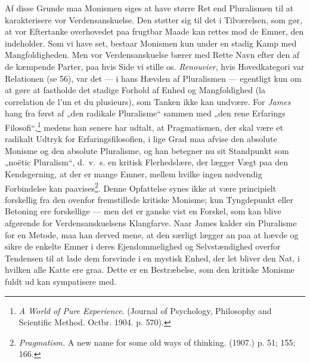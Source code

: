 \documentclass[12pt,a4paper]{book}
\newcommand{\opage}[1]{\marginnote{\footnotesize\textit{[#1]}}}
\begin{document}
Af disse Grunde maa Monismen siges at have større Ret end Pluralismen til at
karakterisere vor Verdensanskuelse. Den støtter sig til det i Tilværelsen, som gør, at
vor Eftertanke overhovedet paa frugtbar Maade kan rettes mod de Emner, den indeholder.
Som vi have set, bestaar Monismen kun under en stadig Kamp med Mangfoldigheden. Men vor
Verdensanskuelse bærer med Rette Navn efter den af de kæmpende Parter, paa hvis Side vi
stille os. \emph{Renouvier}, hvis Hovedkategori var Relationen (se 56), var det --- i
hans Hævden af Pluralismen --- egentligt kun om at gøre at fastholde det stadige Forhold
af Enhed og Mangfoldighed (la correlation de l'un et du plusieurs), som Tanken ikke kan
undvære. For \emph{James} hang fra først af „den radikale Pluralisme“ sammen med „den
rene Erfarings
\opage{326}Filosofi“,\footnote{\emph{A World of Pure Experience}. (Journal of
Psychology, Philosophy and Scientific Method. Octbr. 1904. p. 570).} medens han senere
har udtalt, at Pragmatismen, der skal være et radikalt Udtryk for Erfaringsfilosofien, i
lige Grad maa afvise den absolute Monisme og den absolute Pluralisme, og han betegner nu
sit Standpunkt som „noëtic Pluralism“, d.\ v.\ s. en kritisk Flerhedslære, der lægger
Vægt paa den Kendsgerning, at der er mange Emner, mellem hvilke ingen nødvendig
Forbindelse kan paavises\footnote{\emph{Pragmatism.} A new name for some old ways of thinking. (1907.) p. 51; 155; 166.}. Denne Opfattelse synes ikke at være principielt
forskellig fra den ovenfor fremstillede kritiske Monisme; kun Tyngdepunkt eller Betoning
ere forskellige --- men det er ganske vist en Forskel, som kan blive afgørende for
Verdensanskuelsens Klangfarve. Naar James kalder sin Pluralisme for en Metode, maa han
derved mene, at den særligt lægger an paa at hævde og sikre de enkelte Emner i deres
Ejendommelighed og Selvstændighed overfor Tendensen til at lade dem forsvinde i en
mystisk Enhed, der let bliver den Nat, i hvilken alle Katte ere graa. Dette er en
Bestræbelse, som den kritiske Monisme fuldt ud kan sympatisere med.
\end{document}
